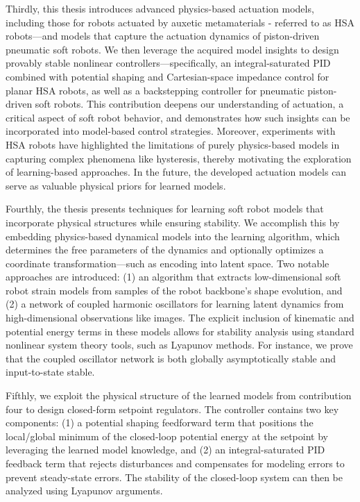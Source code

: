 Thirdly, this thesis introduces advanced physics-based actuation models, including those for robots actuated by auxetic metamaterials - referred to as HSA robots—and models that capture the actuation dynamics of piston-driven pneumatic soft robots. We then leverage the acquired model insights to design provably stable nonlinear controllers—specifically, an integral-saturated PID combined with potential shaping and Cartesian-space impedance control for planar HSA robots, as well as a backstepping controller for pneumatic piston-driven soft robots. This contribution deepens our understanding of actuation, a critical aspect of soft robot behavior, and demonstrates how such insights can be incorporated into model-based control strategies. Moreover, experiments with HSA robots have highlighted the limitations of purely physics-based models in capturing complex phenomena like hysteresis, thereby motivating the exploration of learning-based approaches. In the future, the developed actuation models can serve as valuable physical priors for learned models.

Fourthly, the thesis presents techniques for learning soft robot models that incorporate physical structures while ensuring stability. We accomplish this by embedding physics-based dynamical models into the learning algorithm, which determines the free parameters of the dynamics and optionally optimizes a coordinate transformation—such as encoding into latent space. Two notable approaches are introduced: (1) an algorithm that extracts low-dimensional soft robot strain models from samples of the robot backbone’s shape evolution, and (2) a network of coupled harmonic oscillators for learning latent dynamics from high-dimensional observations like images. The explicit inclusion of kinematic and potential energy terms in these models allows for stability analysis using standard nonlinear system theory tools, such as Lyapunov methods. For instance, we prove that the coupled oscillator network is both globally asymptotically stable and input-to-state stable.

Fifthly, we exploit the physical structure of the learned models from contribution four to design closed-form setpoint regulators. The controller contains two key components: (1) a potential shaping feedforward term that positions the local/global minimum of the closed-loop potential energy at the setpoint by leveraging the learned model knowledge, and (2) an integral-saturated PID feedback term that rejects disturbances and compensates for modeling errors to prevent steady-state errors. The stability of the closed-loop system can then be analyzed using Lyapunov arguments.

